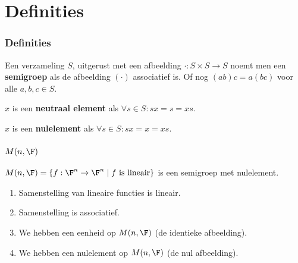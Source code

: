 \section{Definities}

\begin{frame}
\frametitle{Definities}
\begin{block}{}
Een verzameling $S$, uitgerust met een afbeelding $\cdot : S \times S \to S$ noemt men een \textbf{semigroep} als de afbeelding $(\cdot)$ associatief is. Of nog $(ab)c = a(bc)$ voor alle $a,b,c \in S$.
\end{block}

\begin{block}{}
$x$ is een \textbf{neutraal element} als $\forall s \in S: sx = s = xs$. 

$x$ is een \textbf{nulelement} als $\forall s \in S: sx = x = xs$. 
\end{block}

\end{frame}

\begin{frame}
\frametitle{$M(n,\F)$}

\begin{block}{}
$M(n,\F) = \{ f : \F^n \to \F^n \; | \; f \text{ is lineair} \}$ is een semigroep met nulelement.
\begin{enumerate}
\item Samenstelling van lineaire functies is lineair.
\item Samenstelling is associatief.
\item We hebben een eenheid op $M(n,\F)$ (de identieke afbeelding).
\item We hebben een nulelement op $M(n,\F)$ (de nul afbeelding).
\end{enumerate}

\end{block}

\end{frame}


%
%
%


